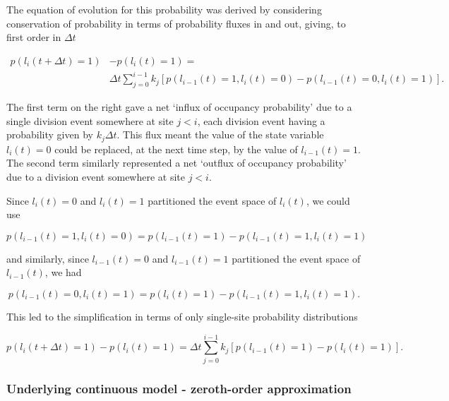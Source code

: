\documentclass[10pt,letterpaper]{article}
\begin{document}
The equation of evolution for this probability was derived by
considering conservation of probability in terms of probability fluxes
in and out, giving, to first order in \(\Delta t\)

\begin{align}p(l_i(t+\Delta t)=1) &- p(l_i(t)=1) = \nonumber \\ &\Delta t\sum_{j=0}^{i-1}k_j\left[p(l_{i-1}(t)=1,l_{i}(t)=0)-p(l_{i-1}(t)=0,l_{i}(t)=1)\right]. \end{align}

The first term on the right gave a net `influx of occupancy probability'
due to a single division event somewhere at site \(j < i\), each
division event having a probability given by \(k_j\Delta t\). This flux
meant the value of the state variable \(l_i(t) = 0\) could be replaced,
at the next time step, by the value of \(l_{i-1}(t) = 1\). The second
term similarly represented a net `outflux of occupancy probability' due
to a division event somewhere at site \(j < i\).

Since \(l_i(t)=0\) and \(l_i(t)=1\) partitioned the event space of
\(l_i(t)\), we could use

\begin{equation}p(l_{i-1}(t) = 1,l_i(t)=0) = p(l_{i-1}(t)=1) - p(l_{i-1}(t) = 1,l_i(t)=1)\label{eq:identities-one}\end{equation}

and similarly, since \(l_{i-1}(t)=0\) and \(l_{i-1}(t)=1\) partitioned
the event space of \(l_{i-1}(t)\), we had

\begin{equation}p(l_{i-1}(t) = 0,l_i(t)=1) = p(l_{i}(t)=1) - p(l_{i-1}(t) = 1,l_i(t)=1). \label{eq:identities-two}\end{equation}

This led to the simplification in terms of only single-site probability
distributions

\begin{equation}p(l_i(t+\Delta t)=1) - p(l_i(t)=1) = \Delta t\sum_{j=0}^{i-1}k_j\left[p(l_{i-1}(t)=1)-p(l_i(t)=1)\right]. \label{eq:label-master-discrete-cons}\end{equation}

\subsubsection{Underlying continuous model - zeroth-order
approximation}\label{underlying-continuous-model---zeroth-order-approximation}
\end{document}
